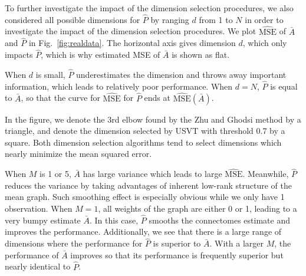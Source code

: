 \documentclass[10pt,letterpaper]{article}
\renewcommand{\hat}{\widehat}
\begin{document}
To further investigate the impact of the dimension selection procedures, we also considered all possible dimensions for $\hat{P}$ by ranging $d$ from 1 to $N$ in order to investigate the impact of the dimension selection procedures.
We plot $\hat{\mathrm{MSE}}$ of $\bar{A}$ and $\hat{P}$ in Fig.~\ref{fig:realdata}.
The horizontal axis gives dimension $d$, which only impacts $\hat{P}$, which is why estimated MSE of $\bar{A}$ is shown as flat.

When $d$ is small, $\hat{P}$ underestimates the dimension and throws away important information, which leads to relatively poor performance. When $d=N$, $\hat{P}$ is equal to $\bar{A}$, so that the curve for $\hat{\mathrm{MSE}}$ for $\hat{P}$ ends at $\hat{\mathrm{MSE}}(\bar{A})$. 

In the figure, we denote the 3rd elbow found by the Zhu and Ghodsi method by a triangle, and denote the dimension selected by USVT with threshold 0.7 by a square. 
Both dimension selection algorithms tend to select dimensions which nearly minimize the mean squared error.

When $M$ is 1 or 5, $\bar{A}$ has large variance which leads to large $\hat{\mathrm{MSE}}$. Meanwhile, $\hat{P}$ reduces the variance by taking advantages of inherent low-rank structure of the mean graph. Such smoothing effect is especially obvious while we only have 1 observation. When $M = 1$, all weights of the graph are either 0 or 1, leading to a very bumpy estimate $\bar{A}$. In this case, $\hat{P}$ smooths the connectomes estimate and improves the performance.
Additionally, we see that there is a large range of dimensions where the performance for $\hat{P}$ is superior to $\bar{A}$. 
With a larger $M$, the performance of $\bar{A}$ improves so that its performance is frequently superior but nearly identical to $\hat{P}$.
\end{document}
